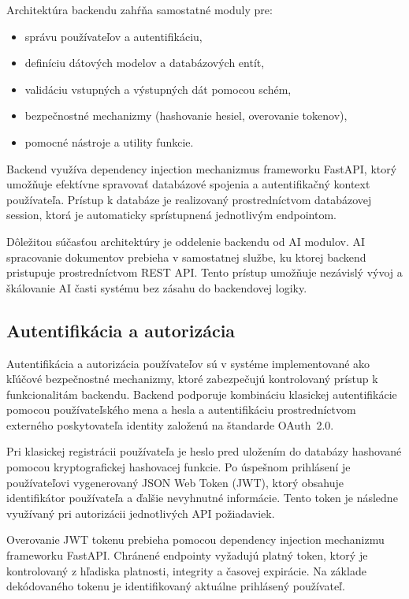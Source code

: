 Architektúra backendu zahŕňa samostatné moduly pre:
\begin{itemize}
    \item správu používateľov a autentifikáciu,
    \item definíciu dátových modelov a databázových entít,
    \item validáciu vstupných a výstupných dát pomocou schém,
    \item bezpečnostné mechanizmy (hashovanie hesiel, overovanie tokenov),
    \item pomocné nástroje a utility funkcie.
\end{itemize}

Backend využíva dependency injection mechanizmus frameworku FastAPI,
ktorý umožňuje efektívne spravovať databázové spojenia a autentifikačný
kontext používateľa. Prístup k databáze je realizovaný prostredníctvom
databázovej session, ktorá je automaticky sprístupnená jednotlivým endpointom.

Dôležitou súčasťou architektúry je oddelenie backendu od AI modulov.
AI spracovanie dokumentov prebieha v samostatnej službe, ku ktorej backend
pristupuje prostredníctvom REST API. Tento prístup umožňuje nezávislý vývoj
a škálovanie AI časti systému bez zásahu do backendovej logiky.

\subsection{Autentifikácia a autorizácia}

Autentifikácia a autorizácia používateľov sú v systéme implementované ako
kľúčové bezpečnostné mechanizmy, ktoré zabezpečujú kontrolovaný prístup
k funkcionalitám backendu. Backend podporuje kombináciu klasickej autentifikácie
pomocou používateľského mena a hesla a autentifikáciu prostredníctvom externého
poskytovateľa identity založenú na štandarde OAuth~2.0.

Pri klasickej registrácii používateľa je heslo pred uložením do databázy
hashované pomocou kryptografickej hashovacej funkcie. Po úspešnom prihlásení
je používateľovi vygenerovaný JSON Web Token (JWT), ktorý obsahuje identifikátor
používateľa a ďalšie nevyhnutné informácie. Tento token je následne využívaný
pri autorizácii jednotlivých API požiadaviek.

Overovanie JWT tokenu prebieha pomocou dependency injection
mechanizmu frameworku FastAPI. Chránené endpointy vyžadujú platný token,
ktorý je kontrolovaný z hľadiska platnosti, integrity a časovej expirácie.
Na základe dekódovaného tokenu je identifikovaný aktuálne prihlásený používateľ.

